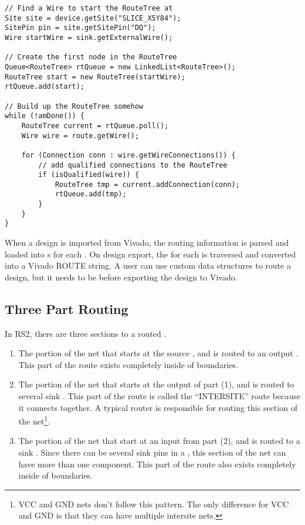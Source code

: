 \begin{lstlisting}[caption=Building a RouteTree,
label=code:routeTree] 
// Find a Wire to start the RouteTree at
Site site = device.getSite("SLICE_X5Y84");
SitePin pin = site.getSitePin("DQ");
Wire startWire = sink.getExternalWire();

// Create the first node in the RouteTree 
Queue<RouteTree> rtQueue = new LinkedList<RouteTree>();
RouteTree start = new RouteTree(startWire);
rtQueue.add(start);

// Build up the RouteTree somehow 
while (!amDone()) {
	RouteTree current = rtQueue.poll();
	Wire wire = route.getWire();

	for (Connection conn : wire.getWireConnections()) {
		// add qualified connections to the RouteTree
		if (isQualified(wire)) {
			RouteTree tmp = current.addConnection(conn);
			rtQueue.add(tmp);
		}
	}
}

\end{lstlisting}

When a design is imported from Vivado, the routing information is parsed and
loaded into s for each \cellnet. On design export, the
 for each  is traversed and converted into a Vivado
ROUTE string. A user can use custom data structures to route a design, but it
needs to be  before
exporting the design to Vivado.  

\subsection{Three Part Routing}
In RS2, there are three sections to a routed  \cellnet. 

\begin{enumerate}
  \item The portion of the net that starts at the source \belpin, and is routed
  to an output \sitepin. This part of the route exists completely inside of
  \site boundaries.
  \item The portion of the net that starts at the output \sitepin of part (1),
  and is routed to several sink \sitepins. This part of the route is
  called the ``INTERSITE'' route because it connects \sites together. A typical
  router is responsible for routing this section of the net\footnote{VCC and
  GND nets don't follow this pattern. The only difference for VCC and GND is
  that they can have multiple intersite nets.}.
  \item The portion of the net that start at an input \sitepin from part (2),
  and is routed to a sink \belpin. Since there can be several sink pins in a
  \cellnet, this section of the net can have more than one component. This part
  of the route also exists completely inside of \site boundaries. 
\end{enumerate}

